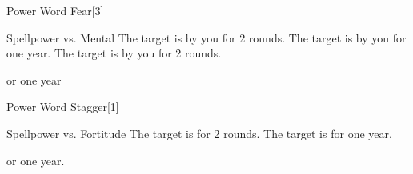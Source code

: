 \begin{spellsection}{Power Word Fear}[3]
    \begin{spellheader}
    \end{spellheader}
    \begin{spellcontent}
        \begin{spelltargetinginfo}
        \end{spelltargetinginfo}
        \begin{spelleffects}
            \begin{spellattack}{Spellpower vs. Mental}
                \spellsuccess The target is \frightened by you for 2 rounds.
                \spellcritical The target is \frightened by you for one year.
                \spellfailure The target is \shaken by you for 2 rounds.
            \end{spellattack}
            \spelldur \durbrief or one year
        \end{spelleffects}
    \end{spellcontent}
    \begin{spellfooter}
        \miscastrandom
    \end{spellfooter}
\end{spellsection}

\begin{spellsection}{Power Word Stagger}[1]
    \begin{spellheader}
    \end{spellheader}
    \begin{spellcontent}
        \begin{spelltargetinginfo}
        \end{spelltargetinginfo}
        \begin{spelleffects}
            \begin{spellattack}{Spellpower vs. Fortitude}
                \spellsuccess The target is \staggered for 2 rounds.
                \spellcritical The target is \staggered for one year.
            \end{spellattack}
            \spelldur \durbrief or one year.
        \end{spelleffects}
    \end{spellcontent}
    \begin{spellfooter}
        \miscastrandom
    \end{spellfooter}
\end{spellsection}

